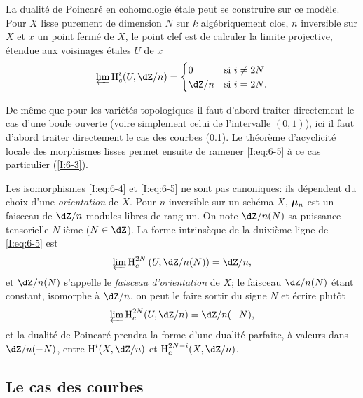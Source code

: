 La dualité de Poincaré en cohomologie étale peut se construire sur ce 
modèle. Pour $X$ lisse purement de dimension $N$ sur $k$ algébriquement clos, 
$n$ inversible sur $X$ et $x$ un point fermé de $X$, le point clef est de 
calculer la limite projective, étendue aux voisinages étales $U$ de $x$ 
\begin{equation}\label{I:eq:6-5}
  \varprojlim \h_c^i(U,\dZ/n) 
    = \begin{cases}
        0     & \text{si $i\ne 2N$} \\
        \dZ/n & \text{si $i=2N$.}
      \end{cases} 
\end{equation}

De même que pour les variétés topologiques il faut d'abord traiter 
directement le cas d'une boule ouverte (voire simplement celui de l'intervalle 
$(0,1)$), ici il faut d'abord traiter directement le cas des courbes 
(\ref{I:6-2}). Le théorème d'acyclicité locale des morphismes lisses 
permet ensuite de ramener \eqref{I:eq:6-5} à ce cas particulier (\ref{I:6-3}). 

Les isomorphismes \eqref{I:eq:6-4} et \eqref{I:eq:6-5} ne sont pas canoniques: 
ils dépendent du choix d'une \emph{orientation} de $X$. Pour $n$ inversible 
sur un schéma $X$, $\dmu_n$ est un faisceau de $\dZ/n$-modules libres de rang 
un. On note $\dZ/n(N)$ sa puissance tensorielle $N$-ième ($N\in\dZ$). La 
forme intrinsèque de la duixième ligne de \eqref{I:eq:6-5} est 
\begin{equation}\label{I:eq:6-5'}
  \varprojlim \h_c^{2N} \left(U,\dZ/n(N)\right) = \dZ/n \text{,}
\end{equation}
et $\dZ/n(N)$ s'appelle le \emph{faisceau d'orientation} de $X$; le faisceau 
$\dZ/n(N)$ étant constant, isomorphe à $\dZ/n$, on peut le faire sortir 
du signe $N$ et écrire plutôt
\begin{equation}\label{I:eq:6-5''}
  \varprojlim \h_c^{2N} (U,\dZ/n) = \dZ/n(-N) \text{,}
\end{equation}
et la dualité de Poincaré prendra la forme d'une dualité parfaite, à 
valeurs dans $\dZ/n(-N)$, entre $\h^i(X,\dZ/n)$ et $\h_c^{2N-i}(X,\dZ/n)$. 










\subsection{Le cas des courbes}\label{I:6-2}





